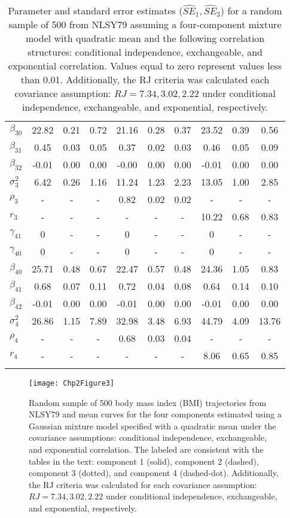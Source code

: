 \begin{table}[ht]
\begin{tabular}{lccccccccc}
  $\beta_{30}$ & 22.82 & 0.21 & 0.72 & 21.16 & 0.28 & 0.37 & 23.52 & 0.39 & 0.56 \\ 
  $\beta_{31}$ & 0.45 & 0.03 & 0.05 & 0.37 & 0.02 & 0.03 & 0.46 & 0.05 & 0.09 \\ 
  $\beta_{32}$ & -0.01 & 0.00 & 0.00 & -0.00 & 0.00 & 0.00 & -0.01 & 0.00 & 0.00 \\ 
  $\sigma_3^2$ & 6.42 & 0.26 & 1.16 & 11.24 & 1.23 & 2.23 & 13.05 & 1.00 & 2.85 \\ 
  $\rho_3$ & - & - & - & 0.82 & 0.02 & 0.02 & - & - & - \\ 
  $r_3$ & - & - & - & - & - & - & 10.22 & 0.68 & 0.83 \\ 
  $\gamma_{41}$ & 0 & - & - & 0 & - & - & 0 & - & - \\ 
  $\gamma_{40}$ & 0 & - & - & 0 & - & - & 0 & - & - \\ 
  $\beta_{40}$ & 25.71 & 0.48 & 0.67 & 22.47 & 0.57 & 0.48 & 24.36 & 1.05 & 0.83 \\ 
  $\beta_{41}$ & 0.68 & 0.07 & 0.11 & 0.72 & 0.04 & 0.08 & 0.64 & 0.14 & 0.10 \\ 
  $\beta_{42}$ & -0.01 & 0.00 & 0.00 & -0.01 & 0.00 & 0.00 & -0.01 & 0.00 & 0.00 \\ 
  $\sigma_4^2$ & 26.86 & 1.15 & 7.89 & 32.98 & 3.48 & 6.93 & 44.79 & 4.09 & 13.76 \\ 
  $\rho_4$ & - & - & - & 0.68 & 0.03 & 0.04 & - & - & - \\ 
  $r_4$ & - & - & - & - & - & - & 8.06 & 0.65 & 0.85 \\ 
   \thickhline\end{tabular}
\caption{Parameter and standard error estimates ($\widehat{SE}_{1},\widehat{SE}_{3}$) for a random sample of 500 from NLSY79 assuming a four-component mixture model with quadratic mean and the following correlation structures: conditional independence, exchangeable, and exponential correlation. Values equal to zero represent values less than 0.01. Additionally, the RJ criteria was calculated each covariance assumption: $RJ=7.34, 3.02, 2.22$ under conditional independence, exchangeable, and exponential, respectively.}
\label{tab:dat}

\end{table}

\begin{figure}[ht]
\centering
\texttt{[image: Chp2Figure3]}
\caption{Random sample of 500 body mass index (BMI) trajectories from NLSY79 and mean curves for the four components estimated using a Gaussian mixture model specified with a quadratic mean under the covariance assumptions: conditional independence, exchangeable, and exponential correlation. The labeled are consistent with the tables in the text: component 1 (solid), component 2 (dashed), component 3 (dotted), and component 4 (dashed-dot). Additionally, the RJ criteria was calculated for each covariance assumption: $RJ =7.34,3.02,2.22$ under conditional independence, exchangeable, and exponential, respectively.}
\label{fig:2-3}
\end{figure}

